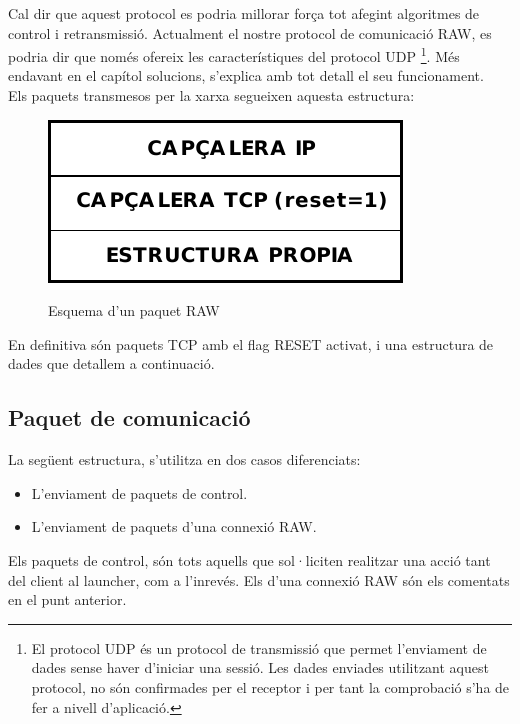 Cal dir que aquest protocol es podria millorar força tot afegint algoritmes de control i retransmissió. Actualment
el nostre protocol de comunicació RAW, es podria dir que només ofereix les característiques del protocol UDP
\footnote{El protocol UDP és un protocol de transmissió que permet l'enviament de dades sense haver d'iniciar una 
sessió. Les dades enviades utilitzant aquest protocol, no són confirmades per el receptor i per tant la comprobació
s'ha de fer a nivell d'aplicació.}. Més endavant en el capítol solucions, s'explica amb tot detall el seu funcionament. \\

Els paquets transmesos per la xarxa segueixen aquesta estructura: \\

\begin{figure}[htp]
    \centering
    \includegraphics[scale=1,keepaspectratio]{diagrames/solutionDesignPacketStructure.pdf} \\
    \caption{Esquema d'un paquet RAW}
    \label{fig:packetScheme}
\end{figure}

En definitiva són paquets TCP amb el flag RESET activat, i una estructura de dades que detallem a continuació.

\subsection{Paquet de comunicació}

La següent estructura, s'utilitza en dos casos diferenciats:
\begin{itemize}
    \item L'enviament de paquets de control.
    \item L'enviament de paquets d'una connexió RAW.
\end{itemize}

Els paquets de control, són tots aquells que sol·liciten realitzar una acció tant del client al launcher, com a l'inrevés.
Els d'una connexió RAW són els comentats en el punt anterior.

